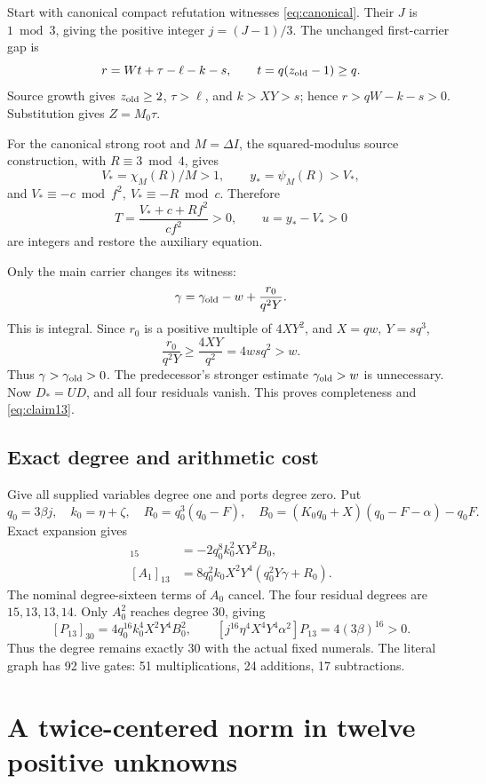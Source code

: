 \documentclass[11pt,a4paper]{article}
\theoremstyle{definition}
\newcommand{\Dstar}{D_{\!*}}
\newcommand{\qzero}{q_{\!0}}
\newcommand{\kzero}{k_{\!0}}
\newcommand{\Rzero}{R_{\!0}}
\newcommand{\Bzero}{B_{\!0}}
\newcommand{\indeg}[2]{[#1]_{#2}}
\begin{document}
Start with canonical compact refutation witnesses
\eqref{eq:canonical}. Their \(J\) is \(1\bmod3\), giving
the positive integer \(j=(J-1)/3\).
The unchanged first-carrier gap is
\[
 r=Wt+\tau-\ell-k-s,\qquad t=q(z_{\rm old}-1)\ge q.
\]
Source growth gives \(z_{\rm old}\ge2\), \(\tau>\ell\),
and \(k>XY>s\); hence \(r>qW-k-s>0\).
Substitution gives \(Z=M_0\tau\).

For the canonical strong root and \(M=\Delta I\), the
squared-modulus source construction, with \(R\equiv3\bmod4\),
gives
\[
 V_*=\chi_M(R)/M>1,\qquad y_*=\psi_M(R)>V_*,
\]
and \(V_*\equiv-c\bmod f^2,\ V_*\equiv-R\bmod c\).
Therefore
\[
 T=\frac{V_*+c+Rf^2}{cf^2}>0,\qquad u=y_*-V_*>0
\]
are integers and restore the auxiliary equation.

Only the main carrier changes its witness:
\[
 \gamma=\gamma_{\rm old}-w+\frac{r_0}{q^2Y}.
\]
This is integral. Since \(r_0\) is a positive multiple of
\(4XY^2\), and \(X=qw,\ Y=sq^3\),
\[
 \frac{r_0}{q^2Y}\ge\frac{4XY}{q^2}=4wsq^2>w.
\]
Thus \(\gamma>\gamma_{\rm old}>0\).
The predecessor's stronger estimate \(\gamma_{\rm old}>w\)
is unnecessary. Now \(\Dstar=UD\), and all four residuals
vanish. This proves completeness and \eqref{eq:claim13}.

\subsection{Exact degree and arithmetic cost}

Give all supplied variables degree one and ports degree zero.
Put
\[
 \qzero=3\beta j,\quad\kzero=\eta+\zeta,\quad
 \Rzero=\qzero^3(\qzero-F),\quad
 \Bzero=(K_0\qzero+X)(\qzero-F-\alpha)-\qzero F .
\]
Exact expansion gives
\begin{align}
 \indeg{A_0}{15}&=-2\qzero^8\kzero^2XY^2\Bzero,\\
 \indeg{A_1}{13}&=8\qzero^2\kzero X^2Y^4
                         (\qzero^2Y\gamma+\Rzero).
\end{align}
The nominal degree-sixteen terms of \(A_0\) cancel.
The four residual degrees are \(15,13,13,14\).
Only \(A_0^2\) reaches degree 30, giving
\[
 \indeg{P_{13}}{30}
        =4\qzero^{16}\kzero^4X^2Y^4\Bzero^2,\qquad
 [j^{16}\eta^4X^4Y^4\alpha^2]P_{13}=4(3\beta)^{16}>0.
\]
Thus the degree remains exactly 30 with the actual fixed
numerals. The literal graph has 92 live gates:
51 multiplications, 24 additions, 17 subtractions.

\section{A twice-centered norm in twelve positive unknowns}
\label{sec:p12}
\end{document}
